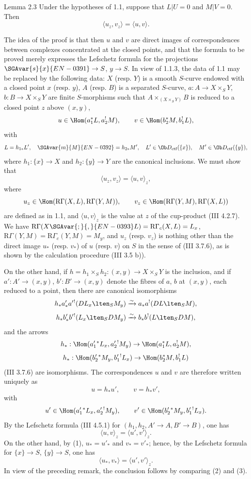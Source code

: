 \begin{statement}{Lemma 2.3}
Under the hypotheses of 1.1, suppose that $L|U=0$ and $M|V=0$. Then
\[
\langle u_z,v_z\rangle=\langle u,v\rangle .
\]
\end{statement}

The idea of the proof is that then $u$ and $v$ are direct images of correspondences between complexes concentrated at the closed points, and that the formula to be proved merely expresses the Lefschetz formula for the projections $\SGAvar{s}{x}{EN-0391}\to S$, $y\to S$. In view of 1.1.3, the data of 1.1 may be replaced by the following data: $X$ (resp. $Y$) is a smooth $S$-curve endowed with a closed point $x$ (resp. $y$), $A$ (resp. $B$) is a separated $S$-curve, $a:A\to X\times_S Y$, $b:B\to X\times_S Y$ are finite $S$-morphisms such that $A\times_{(X\times_SY)}B$ is reduced to a closed point $z$ above $(x,y)$,
\[
u\in\Hom(a_1^*L,a_2^!M),\qquad v\in\Hom(b_2^*M,b_1^!L),
\]
with
\[
L=h_{1*}L',\quad \SGAvar{m}{M}{EN-0392}=h_{2*}M',\quad
L'\in\Ob D_{\mathrm{ctf}}(\{x\}),\quad M'\in\Ob D_{\mathrm{ctf}}(\{y\}),
\]
where $h_1:\{x\}\to X$ and $h_2:\{y\}\to Y$ are the canonical inclusions. We must show that
\[
\langle u_z,v_z\rangle=\langle u,v\rangle_z,
\]
where
\[
u_z\in\Hom(\mathrm R\Gamma(X,L),\mathrm R\Gamma(Y,M)),\qquad
v_z\in\Hom(\mathrm R\Gamma(Y,M),\mathrm R\Gamma(X,L))
\]
are defined as in 1.1, and $\langle u,v\rangle_z$ is the value at $z$ of the cup-product (III 4.2.7). We have $\mathrm R\Gamma(X\SGAvar{;}{,}{EN-0393}L)=\mathrm R\Gamma_c(X,L)=L_x$, $\mathrm R\Gamma(Y,M)=\mathrm R\Gamma_c(Y,M)=M_y$, and $u_z$ (resp. $v_z$) is nothing other than the direct image $u_*$ (resp. $v_*$) of $u$ (resp. $v$) on $S$ in the sense of (III 3.7.6), as is shown by the calculation procedure (III 3.5 b)).

On the other hand, if $h=h_1\times_Sh_2:(x,y)\to X\times_SY$ is the inclusion, and if $a':A'\to(x,y)$, $b':B'\to(x,y)$ denote the fibres of $a$, $b$ at $(x,y)$, each reduced to a point, then there are canonical isomorphisms
\[
h_*a'_*a'{}^!(DL_x\lten_SM_y)
 \xrightarrow{\sim} a_*a^!(DL\lten_SM),
\]
\[
h_*b'_*b'{}^!(L_x\lten_SDM_y)
 \xrightarrow{\sim} b_*b^!(L\lten_SDM),
\]
and the arrows
\[
h_*:\Hom(a_1'{}^*L_x,a_2'{}^!M_y)\to \Hom(a_1^*L,a_2^!M),
\]
\[
h_*:\Hom(b_2'{}^*M_y,b_1'{}^!L_x)\to \Hom(b_2^*M,b_1^!L)
\]
(III 3.7.6) are isomorphisms. The correspondences $u$ and $v$ are therefore written uniquely as
\begin{equation}\tag{1}
u=h_*u',\qquad v=h_*v',
\end{equation}
with
\[
u'\in\Hom(a_1'{}^*L_x,a_2'{}^!M_y),\qquad
v'\in\Hom(b_2'{}^*M_y,b_1'{}^!L_x).
\]
By the Lefschetz formula (III 4.5.1) for $(h_1,h_2,A'\to A,B'\to B)$, one has
\begin{equation}\tag{2}
\langle u,v\rangle_z=\langle u',v'\rangle_z .
\end{equation}
On the other hand, by (1), $u_*=u'_*$ and $v_*=v'_*$; hence, by the Lefschetz formula for $\{x\}\to S$, $\{y\}\to S$, one has
\begin{equation}\tag{3}
\langle u_*,v_*\rangle=\langle u',v'\rangle_z .
\end{equation}
In view of the preceding remark, the conclusion follows by comparing (2) and (3).

